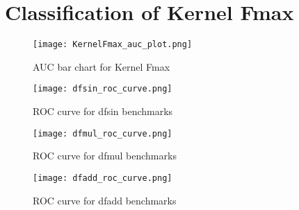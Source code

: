 \section{Classification of Kernel Fmax}

\begin{figure}[h!]
\centering
\texttt{[image: KernelFmax\_auc\_plot.png]}
\caption{AUC bar chart for Kernel Fmax}
\label{figure:kernelfmax_auc_plot}
\end{figure}

\begin{figure}[h!]
\centering
\texttt{[image: dfsin\_roc\_curve.png]}
\caption{ROC curve for dfsin benchmarks}
\label{figure:dfsin_roc_curve}
\end{figure}

\begin{figure}[h!]
\centering
\texttt{[image: dfmul\_roc\_curve.png]}
\caption{ROC curve for dfmul benchmarks}
\label{figure:dfmul_roc_curve}
\end{figure}

\begin{figure}[h!]
\centering
\texttt{[image: dfadd\_roc\_curve.png]}
\caption{ROC curve for dfadd benchmarks}
\label{figure:dfadd_roc_curve}
\end{figure}
